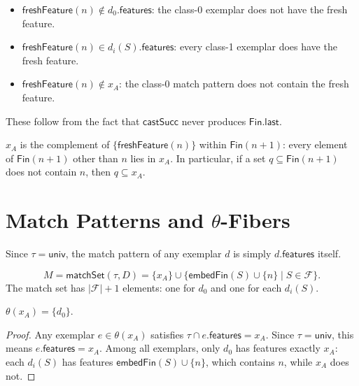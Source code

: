 \begin{lemma}
  \label{lem:fresh-separation}
  \leanok
  \begin{itemize}
    \item $\mathsf{freshFeature}(n) \notin d_0.\mathsf{features}$: the class-0 exemplar
      does not have the fresh feature.
    \item $\mathsf{freshFeature}(n) \in d_i(S).\mathsf{features}$: every class-1
      exemplar does have the fresh feature.
    \item $\mathsf{freshFeature}(n) \notin x_A$: the class-0 match pattern does not
      contain the fresh feature.
  \end{itemize}
  These follow from the fact that $\mathsf{castSucc}$ never produces $\mathsf{Fin.last}$.
\end{lemma}

\begin{lemma}
  \label{lem:xA-complement}
  \leanok
  $x_A$ is the complement of $\{\mathsf{freshFeature}(n)\}$ within
  $\mathsf{Fin}(n+1)$: every element of $\mathsf{Fin}(n+1)$ other than $n$ lies
  in $x_A$.  In particular, if a set $q \subseteq \mathsf{Fin}(n+1)$ does not
  contain $n$, then $q \subseteq x_A$.
\end{lemma}

\section{Match Patterns and \texorpdfstring{$\theta$}{theta}-Fibers}

Since $\tau = \mathsf{univ}$, the match pattern of any exemplar $d$ is simply
$d.\mathsf{features}$ itself.

\begin{lemma}
  \label{lem:matchset}
  \leanok
  \[
    M = \mathsf{matchSet}(\tau, D)
      = \{x_A\} \cup \{\mathsf{embedFin}(S) \cup \{n\} \mid S \in \mathcal{F}\}.
  \]
  The match set has $|\mathcal{F}| + 1$ elements: one for $d_0$ and one for each
  $d_i(S)$.
\end{lemma}

\begin{lemma}
  \label{lem:theta-xA}
  \leanok
  $\theta(x_A) = \{d_0\}$.

  \begin{proof}
    Any exemplar $e \in \theta(x_A)$ satisfies $\tau \cap e.\mathsf{features}
    = x_A$.  Since $\tau = \mathsf{univ}$, this means $e.\mathsf{features} = x_A$.
    Among all exemplars, only $d_0$ has features exactly $x_A$: each $d_i(S)$
    has features $\mathsf{embedFin}(S) \cup \{n\}$, which contains $n$, while
    $x_A$ does not.
  \end{proof}
\end{lemma}

